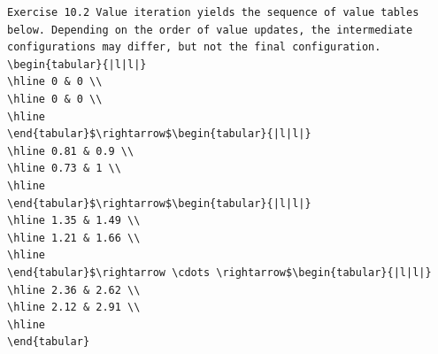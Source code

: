 \documentclass[10pt]{book}
\begin{document}
\begin{center}
\begin{enumerate}
\begin{center}
\begin{center}
\begin{center}
\begin{center}
\begin{center}
\begin{verbatim}
Exercise 10.2 Value iteration yields the sequence of value tables below. Depending on the order of value updates, the intermediate configurations may differ, but not the final configuration.
\begin{tabular}{|l|l|}
\hline 0 & 0 \\
\hline 0 & 0 \\
\hline
\end{tabular}$\rightarrow$\begin{tabular}{|l|l|}
\hline 0.81 & 0.9 \\
\hline 0.73 & 1 \\
\hline
\end{tabular}$\rightarrow$\begin{tabular}{|l|l|}
\hline 1.35 & 1.49 \\
\hline 1.21 & 1.66 \\
\hline
\end{tabular}$\rightarrow \cdots \rightarrow$\begin{tabular}{|l|l|}
\hline 2.36 & 2.62 \\
\hline 2.12 & 2.91 \\
\hline
\end{tabular}


\end{verbatim}
\end{center}
\end{center}
\end{center}
\end{center}
\end{center}
\end{enumerate}
\end{center}
\end{document}
